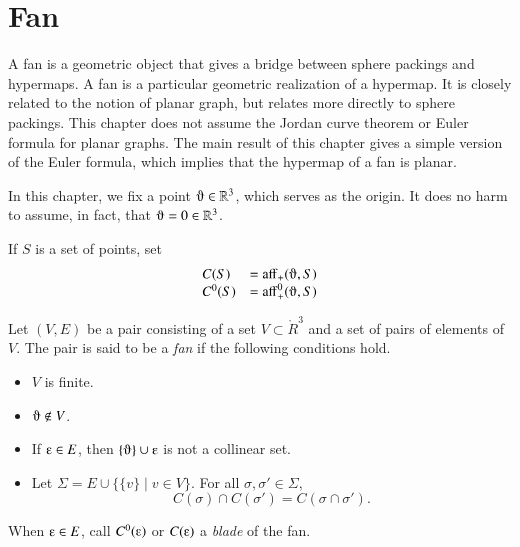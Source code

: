 
\chapter{Fan}\label{sec:fan}

A fan is a geometric object that gives a bridge between sphere packings and hypermaps.  A fan is a particular geometric realization of a hypermap.  It is closely related to the notion of planar graph, but relates more directly to sphere packings.  This chapter does not  assume the Jordan curve theorem or Euler formula for planar graphs.  The main result of this chapter gives a simple version of the Euler formula, 
which implies that the hypermap of a fan is planar.

In this chapter, we fix a point $\orgn\in\ring{R}^3$, which serves as the origin.  It does no harm to assume, in fact, that $\orgn =0\in\ring{R}^3$.

If $S$ is a set of points,
set
  $$
  \begin{array}{lll}
  C(S) &= \op{aff}_+(\orgn,S)\\
  C^0(S) &= \op{aff}^0_+(\orgn,S)\\
  \end{array}
  $$

\begin{definition}[fan]  
Let $(V,E)$ be a pair consisting of a set $V\subset \ring{R}^3$ and a set of pairs of elements of $V$.  The pair is said to be
a {\it fan\/} if the following conditions hold.
    \begin{itemize}
    \item $V$ is finite.
    \item $\orgn\not\in V$.
    \item If $\e \in E$, then $\{\orgn\}\cup \e$ is not a collinear set.
    \item Let $\Sigma = E \cup \{\{v\}\mid v\in V\}$.
    For all $\sigma,\sigma'\in \Sigma$, 
 $$C(\sigma)\cap C(\sigma') = C(\sigma\cap \sigma').$$
    \end{itemize}
When $\e\in E$, call $C^0(\e)$ or $C(\e)$ a {\it blade\/} of the fan.
\end{definition}


